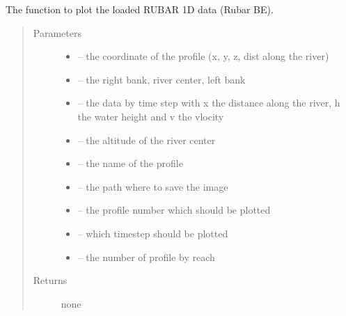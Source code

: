 \documentclass[letterpaper,10pt,english]{sphinxmanual}
\begin{document}

\begin{fulllineitems}
\label{\detokenize{index:src.rubar.figure_rubar1d}}
The function to plot the loaded RUBAR 1D data (Rubar BE).
\begin{quote}\begin{description}
\item[{Parameters}] \leavevmode\begin{itemize}
\item {} 
 -- the coordinate of the profile (x, y, z, dist along the river)

\item {} 
 -- the right bank, river center, left bank

\item {} 
 -- the data by time step with x the distance along the river, h the water height and v the vlocity

\item {} 
 -- the altitude of the river center

\item {} 
 -- the name of the profile

\item {} 
 -- the path where to save the image

\item {} 
 -- the profile number which should be plotted

\item {} 
 -- which timestep should be plotted

\item {} 
 -- the number of profile by reach

\end{itemize}

\item[{Returns}] \leavevmode
none

\end{description}\end{quote}

\end{fulllineitems}
\end{document}
